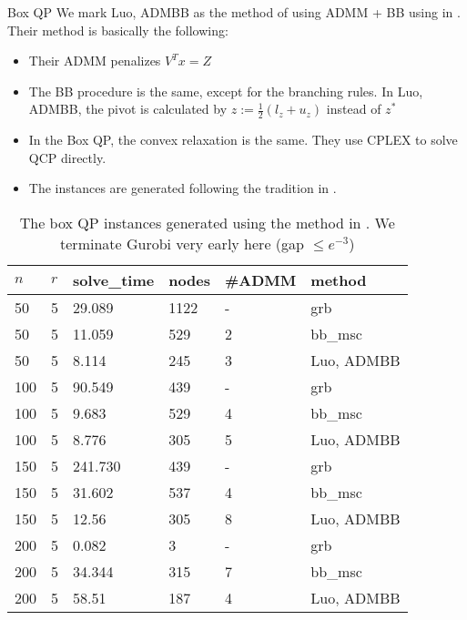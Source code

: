 \documentclass[aspectratio=1610, 9pt]{beamer}
\begin{document}
\begin{frame}[allowframebreaks]{Box QP}
  We mark \textsf{Luo, ADMBB} as the method of using ADMM + BB using in \cite{luo_new_2019}.  Their method is basically the following:
  \begin{itemize}
    \item Their ADMM penalizes \(V^Tx = Z\)
    \item The BB procedure is the same, except for the branching rules. In \textsf{Luo, ADMBB}, the pivot is calculated by \(z := \frac{1}{2}(l_z + u_z)\) instead of \(z^*\)
    \item In the Box QP, the convex relaxation is the same. They use CPLEX to solve QCP directly.
    \item The instances are generated following the tradition in \cite{le_an_solving_1997}.
  \end{itemize}

  \framebreak

  \begin{table}[h!]
    \centering
    \begin{tabular}{llllll}
      \toprule
      \(n\) & \(r\) & solve\_time & nodes & \#ADMM & method              \\
      \midrule
      50    & 5     & 29.089      & 1122  & -      & grb                 \\
      50    & 5     & 11.059      & 529   & 2      & bb\_msc             \\
      50    & 5     & 8.114       & 245   & 3      & \textsf{Luo, ADMBB} \\
      100   & 5     & 90.549      & 439   & -      & grb                 \\
      100   & 5     & 9.683       & 529   & 4      & bb\_msc             \\
      100   & 5     & 8.776       & 305   & 5      & \textsf{Luo, ADMBB} \\
      150   & 5     & 241.730     & 439   & -      & grb                 \\
      150   & 5     & 31.602      & 537   & 4      & bb\_msc             \\
      150   & 5     & 12.56       & 305   & 8      & \textsf{Luo, ADMBB} \\
      200   & 5     & 0.082       & 3     & -      & grb                 \\
      200   & 5     & 34.344      & 315   & 7      & bb\_msc             \\
      200   & 5     & 58.51       & 187   & 4      & \textsf{Luo, ADMBB} \\
      \bottomrule
    \end{tabular}
    \caption{The box QP instances generated using the method in \cite{luo_new_2019}.
      We terminate Gurobi very early here (gap \(\le e^{-3}\))}


\end{table}
\end{frame}
\end{document}
